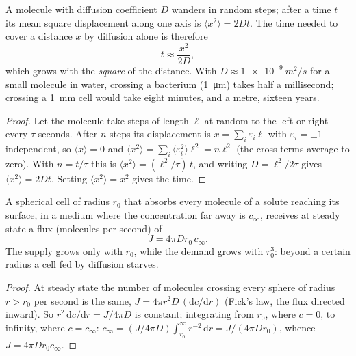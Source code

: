 \begin{theorem}\label{thm:b2:unicellular-diversity:diffusion}
A molecule with diffusion coefficient $D$ wanders in random steps;
after a time $t$ its mean square displacement along one axis is
$\langle x^2\rangle = 2Dt$. The time needed to cover a distance $x$
by diffusion alone is therefore
\[
t \approx \frac{x^2}{2D},
\]
which grows with the \emph{square} of the distance. With
$D \approx \qty{1e-9}{m^2/s}$ for a small molecule in water, crossing
a bacterium (\qty{1}{\micro m}) takes half a millisecond; crossing a
\qty{1}{mm} cell would take eight minutes, and a metre, sixteen
years.
\end{theorem}
\begin{proof}
Let the molecule take steps of length $\ell$ at random to the left
or right every $\tau$ seconds. After $n$ steps its displacement is
$x = \sum_i \varepsilon_i \ell$ with $\varepsilon_i = \pm 1$
independent, so $\langle x\rangle = 0$ and $\langle x^2\rangle =
\sum_i \langle\varepsilon_i^2\rangle \ell^2 = n\ell^2$ (the cross
terms average to zero). With $n = t/\tau$ this is $\langle x^2\rangle
= (\ell^2/\tau)\,t$, and writing $D = \ell^2/2\tau$ gives
$\langle x^2\rangle = 2Dt$. Setting $\langle x^2\rangle = x^2$ gives
the time.
\end{proof}

\begin{theorem}\label{thm:b2:unicellular-diversity:supply}
A spherical cell of radius $r_0$ that absorbs every molecule of a
solute reaching its surface, in a medium where the concentration far
away is $c_\infty$, receives at steady state a flux (molecules per
second) of
\[
J = 4\pi D r_0\, c_\infty .
\]
The supply grows only with $r_0$, while the demand grows with
$r_0^3$: beyond a certain radius a cell fed by diffusion starves.
\end{theorem}
\begin{proof}
At steady state the number of molecules crossing every sphere of
radius $r > r_0$ per second is the same, $J = 4\pi r^2 D\,
(\mathrm{d}c/\mathrm{d}r)$ (Fick's law, the flux directed inward).
So $r^2\,\mathrm{d}c/\mathrm{d}r = J/4\pi D$ is constant; integrating
from $r_0$, where $c = 0$, to infinity, where $c = c_\infty$:
$c_\infty = (J/4\pi D)\int_{r_0}^{\infty} r^{-2}\,\mathrm{d}r =
J/(4\pi D r_0)$, whence $J = 4\pi D r_0 c_\infty$.
\end{proof}

